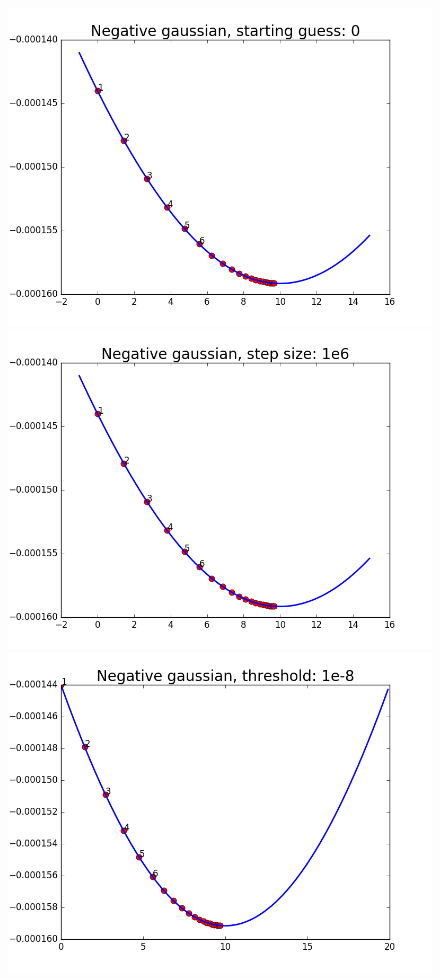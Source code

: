 \documentclass{article}
\begin{document}
\begin{figure}[width=\linewidth]
\centering
\begin{multicols}{2}
  \includegraphics[width=1.2\linewidth]{code/P1/negative_gaussian,starting0.png}
  \includegraphics[width=1.2\linewidth]{code/P1/negative_gaussian,stepsize1e6.png}
  \includegraphics[width=1.2\linewidth]{code/P1/negative_gaussian,threshold1e-8.png}

\end{multicols}
\end{figure}
\end{document}
